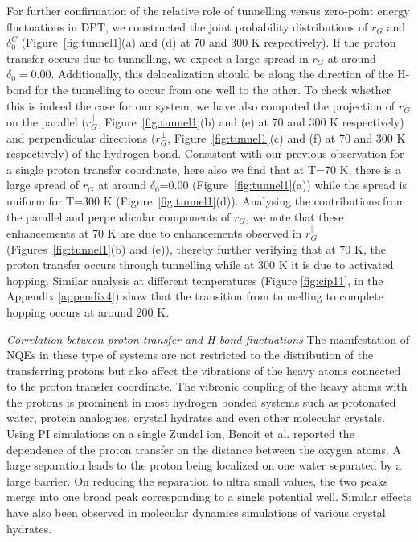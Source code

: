 For further confirmation of the relative role of tunnelling versus zero-point energy 
fluctuations in DPT, we constructed the joint probability distributions of $r_G$ 
and $\delta_0^C$
(Figure~\ref{fig:tunnel1}(a) and (d) at 70 and 300 K respectively).
If the proton transfer occurs due to tunnelling, we expect a large spread in 
$r_G$ at around $\delta_0 = 0.00$. Additionally, this delocalization should be
along the direction of the H-bond for the tunnelling to occur from one well
to the other. To check whether this is indeed the case for our system, we have also
computed the projection of $r_G$ on the parallel ($r_G^{\parallel}$,
Figure~\ref{fig:tunnel1}(b) and (e) at 70 and 
300 K respectively) and perpendicular directions ($r_G^{\perp}$, Figure~\ref{fig:tunnel1}(c) and (f) at 70 and 
300 K respectively) of the hydrogen bond.
Consistent with our previous observation for a single proton transfer coordinate, here also we find that
at T=70 K, there is a large spread of $r_G$ at around $\delta_0$=0.00 
(Figure~\ref{fig:tunnel1}(a)) while the spread is uniform for T=300 K (Figure~\ref{fig:tunnel1}(d)). Analysing the
contributions from the parallel and perpendicular components of $r_G$, we note that these
enhancements at 70 K are due to enhancements observed in $r_G^{\parallel}$
(Figures~\ref{fig:tunnel1}(b) and (e)), 
thereby further verifying that at 70 K, the proton transfer occurs through
tunnelling while at 300 K it is due to activated hopping. Similar analysis at
different temperatures (Figure \ref{fig:cip11}, in the Appendix \ref{appendix4}) show that the transition from tunnelling to complete hopping occurs at around 200 K.


\noindent \textit{Correlation between proton transfer and H-bond fluctuations} The manifestation of NQEs in these type of systems are not restricted to the distribution of the transferring protons but also affect the vibrations of the 
heavy atoms connected to the proton transfer coordinate. The vibronic coupling of the heavy atoms with the protons is prominent in most hydrogen bonded 
systems such as protonated  water\cite{marx1999nature, hassanali2013proton, benoit2005shapes}, protein analogues\cite{zhou2020symmetry}, crystal 
hydrates\cite{hassanali2012fuzzy,buch2007elusive,buch2008hcl} and even other molecular crystals\cite{wikfeldt2014communication,srinivasan2011isotope}. Using PI simulations on a 
single Zundel ion, Benoit et al.\cite{benoit2005shapes} reported the dependence of the proton transfer on the distance between the oxygen atoms. A large 
separation leads to the proton being localized on one water separated by a large barrier. On reducing the separation to ultra small values, the two peaks 
merge into one broad peak corresponding to a single potential well. Similar effects have also been observed in molecular dynamics simulations of various 
crystal hydrates\cite{hassanali2012fuzzy,buch2007elusive,buch2008hcl}.

